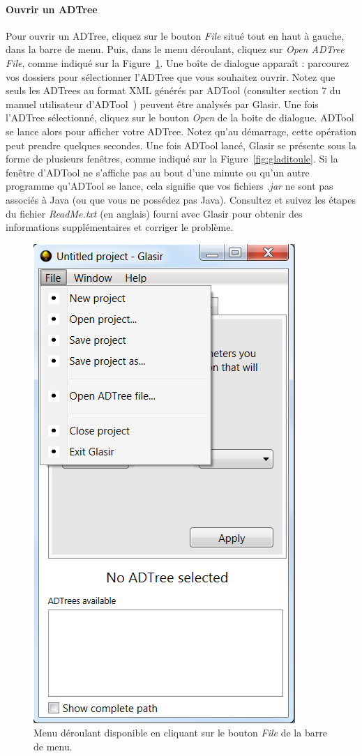 \paragraph{Ouvrir un ADTree}
Pour ouvrir un ADTree, cliquez sur le bouton \emph{File} situé tout en haut à gauche, dans la barre de menu. Puis, dans le menu déroulant, cliquez sur \emph{Open ADTree File}, comme indiqué sur la {\sc Figure}~\ref{fig:file}. Une boîte de dialogue apparaît : parcourez vos dossiers pour sélectionner l'ADTree que vous souhaitez ouvrir. Notez que seuls les ADTrees au format XML générés par ADTool (consulter {\sc section} 7 du manuel utilisateur d'ADTool~\cite{ADTool_Manual}) peuvent être analysés par Glasir. Une fois l'ADTree sélectionné, cliquez sur le bouton \emph{Open} de la boite de dialogue. ADTool se lance alors pour afficher votre ADTree. Notez qu'au démarrage, cette opération peut prendre quelques secondes. Une fois ADTool lancé, Glasir se présente sous la forme de plusieurs fenêtres, comme indiqué sur la {\sc Figure}~\ref{fig:gladitoule}. Si la fenêtre d'ADTool ne s'affiche pas au bout d'une minute ou qu'un autre programme qu'ADTool se lance, cela signifie que vos fichiers \emph{.jar} ne sont pas associés à Java (ou que vous ne possédez pas Java). Consultez et suivez les étapes du fichier \emph{ReadMe.txt} (en anglais) fourni avec Glasir pour obtenir des informations supplémentaires et corriger le problème.

	\begin{figure}[H]
        \centering
        \includegraphics[height=0.7\textwidth]{figure/openfile.png}
        \caption{Menu déroulant disponible en cliquant sur le bouton \emph{File} de la barre de menu.}
        \label{fig:file}
    \end{figure}
    
